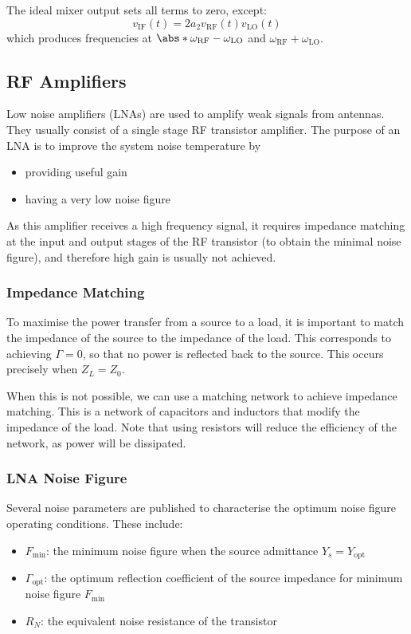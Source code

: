 \documentclass{article}
\begin{document}
The ideal mixer output sets all terms to zero, except:
\begin{equation*}
    v_{\mathrm{IF}}\left( t \right) = 2 a_2 v_{\mathrm{RF}}\left( t \right) v_{\mathrm{LO}}\left( t \right)
\end{equation*}
which produces frequencies at \(\abs*{\omega_{\mathrm{RF}} - \omega_{\mathrm{LO}}}\) and \(\omega_{\mathrm{RF}} + \omega_{\mathrm{LO}}\).
\subsection{RF Amplifiers}
Low noise amplifiers (LNAs) are used to amplify weak signals from
antennas. They usually consist of a single stage RF transistor
amplifier. The purpose of an LNA is to improve the system noise
temperature by
\begin{itemize}
    \item providing useful gain
    \item having a very low noise figure
\end{itemize}
As this amplifier receives a high frequency signal, it requires
impedance matching at the input and output stages of the RF transistor
(to obtain the minimal noise figure), and therefore high gain is usually
not achieved.
\subsubsection{Impedance Matching}
To maximise the power transfer from a source to a load, it is important
to match the impedance of the source to the impedance of the load. This
corresponds to achieving \(\Gamma = 0\), so that no power is reflected
back to the source. This occurs precisely when \(Z_L = Z_0\).

When this is not possible, we can use a matching network to achieve
impedance matching. This is a network of capacitors and inductors that
modify the impedance of the load. Note that using resistors will reduce
the efficiency of the network, as power will be dissipated.
\subsubsection{LNA Noise Figure}
Several noise parameters are published to characterise the optimum
noise figure operating conditions. These include:
\begin{itemize}
    \item \(F_{\min}\): the minimum noise figure when the source admittance \(Y_s = Y_{\mathrm{opt}}\)
    \item \(\Gamma_{\mathrm{opt}}\): the optimum reflection coefficient of the source impedance for minimum noise figure \(F_{\min}\)
    \item \(R_N\): the equivalent noise resistance of the transistor
\end{itemize}
\end{document}
